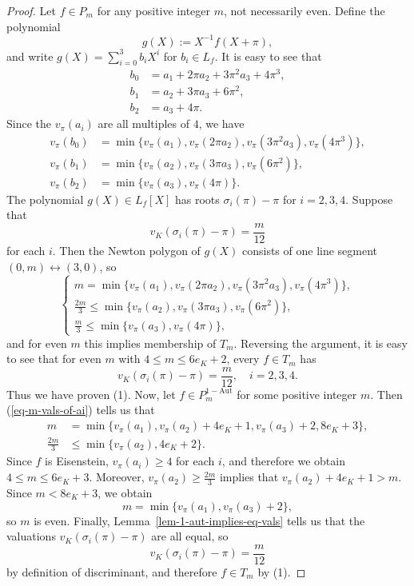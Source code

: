\documentclass[11pt]{amsart}
\theoremstyle{theorem}
\theoremstyle{example}
\theoremstyle{definition}
\numberwithin{theorem}{section}
\numberwithin{theorem}{section}
\newcommand{\oneaut}{\mathrm{1-Aut}}
\begin{document}
\begin{proof}
    Let $f \in P_m$ for any positive integer $m$, not necessarily even. Define the polynomial 
    $$
    g(X) := X^{-1}f(X + \pi),
    $$
    and write $g(X) = \sum_{i=0}^3 b_iX^i$ for $b_i \in L_f$. 
    It is easy to see that 
    \begin{align*}
        b_0 &= a_1 + 2\pi a_2 + 3\pi^2 a_3 + 4\pi^3,
        \\
        b_1 &= a_2 + 3\pi a_3 + 6\pi^2,
        \\
        b_2 &= a_3 + 4\pi. 
    \end{align*}
    Since the $v_\pi(a_i)$ are all multiples of $4$, we have 
    \begin{align*}
        v_\pi(b_0) &= \min\{v_\pi(a_1), v_\pi(2\pi a_2), v_\pi(3\pi^2 a_3), v_\pi(4\pi^3)\},
        \\
        v_\pi(b_1) &= \min\{v_\pi(a_2), v_\pi(3\pi a_3), v_\pi(6\pi^2)\},
        \\
        v_\pi(b_2) &= \min\{v_\pi(a_3), v_\pi(4\pi)\}.
    \end{align*}
    The polynomial $g(X) \in L_f[X]$ has roots $\sigma_i(\pi) - \pi$ for $i=2,3,4$. Suppose that
    $$
    v_K(\sigma_i(\pi) - \pi) = \frac{m}{12}
    $$ 
    for each $i$. Then the Newton polygon of $g(X)$ consists of one line segment $(0,m)\leftrightarrow(3,0)$, so
    \begin{equation}
        \label{eq-m-vals-of-ai}\tag{$*$}
    \begin{cases}
        m = \min\{v_\pi(a_1), v_\pi(2\pi a_2), v_\pi(3\pi^2 a_3), v_\pi(4\pi^3)\},
        \\
        \frac{2m}{3} \leq \min\{v_\pi(a_2), v_\pi(3\pi a_3), v_\pi(6\pi^2)\},
        \\
        \frac{m}{3} \leq \min\{v_\pi(a_3), v_\pi(4\pi)\},
\end{cases}
\end{equation}
    and for even $m$ this implies membership of $T_m$. Reversing the argument, it is easy to see that for even $m$ with $4 \leq m \leq 6e_K + 2$, every $f \in T_m$ has 
    $$
    v_K(\sigma_i(\pi) - \pi) = \frac{m}{12},\quad i=2,3,4.
    $$
    Thus we have proven (1). Now, let $f \in P_m^{\oneaut}$ for some positive integer $m$. Then (\ref{eq-m-vals-of-ai}) tells us that 
    \begin{align*}
        m &= \min\{v_\pi(a_1), v_\pi(a_2) + 4e_K + 1, v_\pi(a_3) + 2, 8e_K + 3\},
        \\
        \frac{2m}{3} &\leq \min\{v_\pi(a_2), 4e_K + 2\}.
    \end{align*}
    Since $f$ is Eisenstein, $v_\pi(a_i)\geq 4$ for each $i$, and therefore we obtain $4 \leq m \leq 6e_K + 3$. Moreover, $v_\pi(a_2) \geq \frac{2m}{3}$ implies that $v_\pi(a_2) + 4e_K + 1 > m$. Since $m < 8e_K + 3$, we obtain
    $$
    m = \min\{v_\pi(a_1), v_\pi(a_3) + 2\},
    $$
    so $m$ is even. Finally, Lemma~\ref{lem-1-aut-implies-eq-vals} tells us that the valuations $v_K(\sigma_i(\pi) - \pi)$ are all equal, so 
    $$
    v_K(\sigma_i(\pi) - \pi) = \frac{m}{12}
    $$
    by definition of discriminant, and therefore $f \in T_m$ by (1). 
\end{proof}
\end{document}
